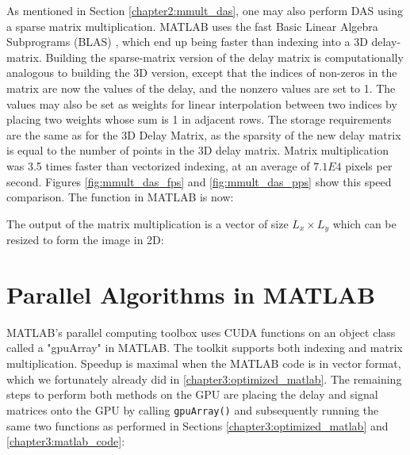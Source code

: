     As mentioned in Section \ref{chapter2:mmult_das}, one may also perform DAS using a sparse matrix multiplication. MATLAB uses the fast Basic Linear Algebra Subprograms (BLAS) \cite{BLASBasicLinear} \cite{davisAlgorithm1000SuiteSparse2019}, which end up being faster than indexing into a 3D delay-matrix. Building the sparse-matrix version of the delay matrix is computationally analogous to building the 3D version, except that the indices of non-zeros in the matrix are now the values of the delay, and the nonzero values are set to 1. The values may also be set as weights for linear interpolation between two indices by placing two weights whose sum is 1 in adjacent rows. The storage requirements are the same as for the 3D Delay Matrix, as the sparsity of the new delay matrix is equal to the number of points in the 3D delay matrix. Matrix multiplication was 3.5 times faster than vectorized indexing, at an average of $7.1E4$ pixels per second. Figures \ref{fig:mmult_das_fps} and \ref{fig:mmult_das_pps} show this speed comparison. The function in MATLAB is now:

    

    The output of the matrix multiplication is a vector of size $L_x \times L_y$ which can be resized to form the image in 2D:

    


\section{Parallel Algorithms in MATLAB}
\label{chapter3:parallel_matlab}

    MATLAB's parallel computing toolbox \cite{MATLABGPUComputing} uses CUDA functions on an object class called a "gpuArray" in MATLAB. The toolkit supports both indexing and matrix multiplication. Speedup is maximal when the MATLAB code is in vector format, which we fortunately already did in \ref{chapter3:optimized_matlab}. The remaining steps to perform both methods on the GPU are placing the delay and signal matrices onto the GPU by calling \lstinline[style = MATLAB-editor]{gpuArray()} and subsequently running the same two functions as performed in Sections \ref{chapter3:optimized_matlab} and \ref{chapter3:matlab_code}:


